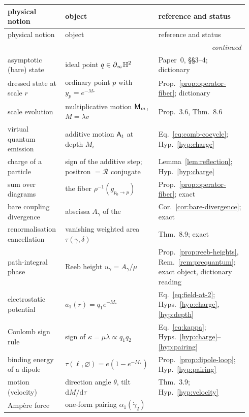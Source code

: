 {\small
\renewcommand{\arraystretch}{1.22}%
\begin{longtable}{@{}p{0.235\linewidth}p{0.335\linewidth}p{0.365\linewidth}@{}}
\toprule
physical notion & \AEG{} object & reference and status \\
\midrule
\endfirsthead
\toprule
physical notion & \AEG{} object & reference and status \\
\midrule
\endhead
\midrule
\multicolumn{3}{r}{\emph{continued}}\\
\endfoot
\bottomrule
\endlastfoot
asymptotic (bare) state & ideal point $q\in\partial_\infty\mathbb{H}^2$
& Paper~0, \S\S 3--4; dictionary \\
dressed state at scale $r$ & ordinary point $p$ with $y_p=e^{-M_*}$
& Prop.~\ref{prop:operator-fiber}; dictionary \\
scale evolution & multiplicative motion $\mathsf M_m$, $M=\lambda v$
& Prop.~3.6, Thm.~8.6 \\
virtual quantum emission & additive motion $\mathsf A_t$ at depth $M_i$
& Eq.~\eqref{eq:comb-cocycle}; Hyp.~\ref{hyp:charge} \\
charge of a particle & sign of the additive step; positron $=\mathcal R$
conjugate
& Lemma~\ref{lem:reflection}; Hyp.~\ref{hyp:charge} \\
sum over diagrams & the fiber $\rho^{-1}(g_{p_0\to p})$
& Prop.~\ref{prop:operator-fiber}; exact \\
bare coupling divergence & abscissa $A_\gamma$ of the \ACS{}
& Cor.~\ref{cor:bare-divergence}; exact \\
renormalisation cancellation & vanishing weighted area
$\tau(\gamma,\delta)$
& Thm.~8.9; exact \\
path-integral phase & Reeb height $u_\gamma=A_\gamma/\mu$
& Prop.~\ref{prop:reeb-heights}, Rem.~\ref{rem:prequantum}; exact object,
dictionary reading \\
electrostatic potential & $a_1(r)=q_1e^{-M_*}$
& Eq.~\eqref{eq:field-at-2}; Hyps.~\ref{hyp:charge}, \ref{hyp:depth} \\
Coulomb sign rule & sign of $\kappa=\mu\lambda\propto q_1q_2$
& Eq.~\eqref{eq:kappa}; Hyps.~\ref{hyp:charge}--\ref{hyp:pairing} \\
binding energy of a dipole & $\tau(\ell,\varnothing)=e(1-e^{-M_*})$
& Prop.~\ref{prop:dipole-loop}; Hyp.~\ref{hyp:pairing} \\
motion (velocity) & direction angle $\theta$, tilt $\mathrm dM/\mathrm d\tau$
& Thm.~3.9; Hyp.~\ref{hyp:velocity} \\
Amp\`ere force & one-form pairing $\alpha_1(\dot\gamma_2)$

\end{longtable}}
